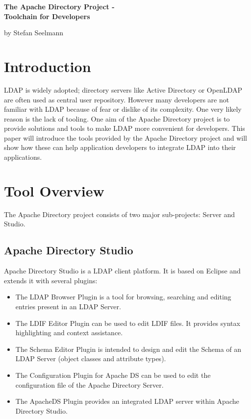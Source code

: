 \documentclass[a4paper,11pt,oneside]{article}
\begin{document}
\thispagestyle{empty}
\begin{Huge}
\noindent
\textbf{The Apache Directory Project - } \\
\textbf{Toolchain for Developers} \\
\end{Huge}

by Stefan Seelmann \\

\section{Introduction}
LDAP is widely adopted; directory servers like Active Directory or OpenLDAP are often used as central user repository. However many developers are not familiar with LDAP because of fear or dislike of its complexity. One very likely reason is the lack of tooling. One aim of the Apache Directory project is to provide solutions and tools to make LDAP more convenient for developers. This paper will introduce the tools provided by the Apache Directory project and will show how these can help application developers to integrate LDAP into their applications.


\section{Tool Overview}

The Apache Directory project consists of two major sub-projects: Server and Studio.

\subsection{Apache Directory Studio}
Apache Directory Studio is a LDAP client platform. It is based on Eclipse and extends it with several plugins:
\begin{itemize}
\item The LDAP Browser Plugin is a tool for browsing, searching and editing entries present in an LDAP Server.
\item The LDIF Editor Plugin can be used to edit LDIF files. It provides syntax highlighting and context assistance.
\item The Schema Editor Plugin is intended to design and edit the Schema of an LDAP Server (object classes and attribute types).
\item The Configuration Plugin for Apache DS can be used to edit the configuration file of the Apache Directory Server.
\item The ApacheDS Plugin provides an integrated LDAP server within Apache Directory Studio.
\end{itemize}
\end{document}
